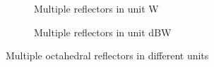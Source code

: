 \documentclass[12pt,DIV14,BCOR12mm,a4paper,footinclude=false,headinclude,parskip=half-,twoside,openright,cleardoublepage=empty,toc=index,bibliography=totoc,listof=totoc]{scrreprt}
\numberwithin{equation}{chapter}
\begin{document}
\begin{figure}[t]
    \centering
    \begin{subfigure}{0.45\textwidth}
        \centering
        \caption{Multiple reflectors in unit W}
    \end{subfigure}\hspace{0.5cm}
    \begin{subfigure}{0.45\textwidth}
        \centering
        \caption{Multiple reflectors in unit dBW}
    \end{subfigure}
    \caption{Multiple octahedral reflectors in different units}
    \label{multiple octahedral reflectors in different units}
\end{figure}
\end{document}
